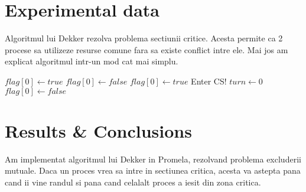 \documentclass{article}
\begin{document}
\section{Experimental data}
\hspace{0.5 cm}
Algoritmul lui Dekker rezolva problema sectiunii critice. Acesta permite ca 2 procese sa utilizeze resurse comune fara sa existe conflict intre ele. Mai jos am explicat algoritmul intr-un mod cat mai simplu.

\begin{algorithm} 
\caption{}
\begin{algorithmic}[1]
\STATE $flag[0] \gets true$ 
\newline
{}
\STATE $flag[0] \gets false$
\ENDWHILE
{}
\STATE $flag[0] \gets true$
\ENDIF
\ENDWHILE
\STATE Enter CS!
\STATE$turn \gets 0$
\STATE$flag[0] \gets false$

\end{algorithmic}
\end{algorithm}

\section{Results \& Conclusions}
\hspace{0.5 cm}
Am implementat algoritmul lui Dekker in Promela, rezolvand problema excluderii mutuale. Daca un proces vrea sa intre in sectiunea critica, acesta va astepta pana cand ii vine randul si pana cand celalalt proces a iesit din zona critica.
\end{document}
